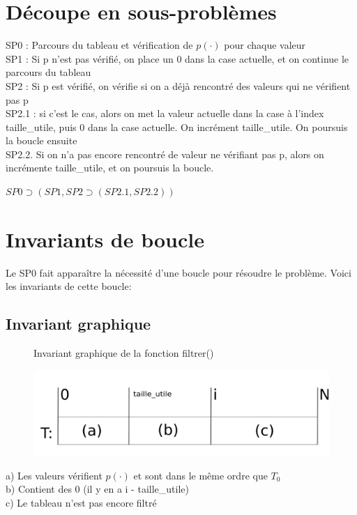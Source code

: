 \documentclass[a4paper, 11pt, oneside]{article}
\begin{document}
\section{Découpe en sous-problèmes}
SP0 : Parcours du tableau et vérification de  $p(\cdot)$ pour chaque valeur
\\SP1 : Si p n'est pas vérifié, on place un 0 dans la case actuelle, et on continue le parcours du tableau
\\SP2 : Si p est vérifié, on vérifie si on a déjà rencontré des valeurs qui ne vérifient pas p
\\SP2.1 : si c'est le cas, alors on met la valeur actuelle dans la case à l'index taille\_utile, puis 0 dans la case actuelle. On incrément taille\_utile. On poursuis la boucle ensuite
\\SP2.2. Si on n'a pas encore rencontré de valeur ne vérifiant pas p, alors on incrémente taille\_utile, et on poursuis la boucle. 

$SP0 \supset (SP1, SP2 \supset (SP2.1, SP2.2))$



\section{Invariants de boucle}
Le SP0 fait apparaître la nécessité d'une boucle pour résoudre le problème. 
Voici les invariants de cette boucle:

\subsection{Invariant graphique}
\begin{figure}{Invariant graphique de la fonction filtrer()}

\includegraphics[scale = 0.5]{Capture d’écran 2022-03-23 165331.png}
\end{figure}

a) Les valeurs vérifient $p(\cdot)$ et sont dans le même ordre que $T_{0}$\\
b) Contient des 0 (il y en a i - taille\_utile)\\
c) Le tableau n'est pas encore filtré\\
\end{document}
